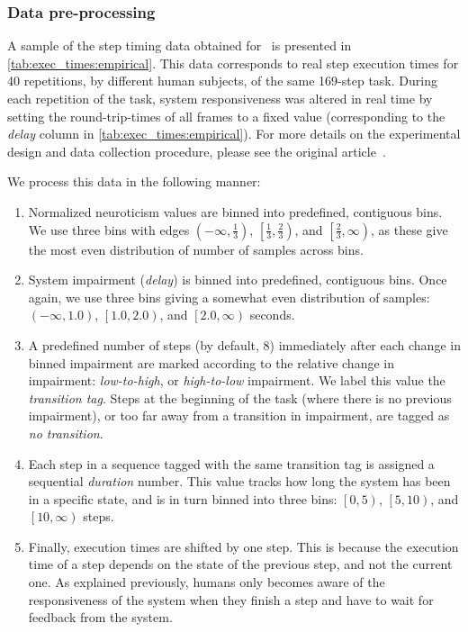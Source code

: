 \subsubsection{Data pre-processing}

A sample of the step timing data obtained for~\cite{olguinmunoz:impact2021} is presented in \cref{tab:exec_times:empirical}.
This data corresponds to real step execution times for \num{40} repetitions, by different human subjects, of the same \num{169}-step task.
During each repetition of the task, system responsiveness was altered in real time by setting the round-trip-times of all frames to a fixed value (corresponding to the \emph{delay} column in \cref{tab:exec_times:empirical}).
For more details on the experimental design and data collection procedure, please see the original article~\cite{olguinmunoz:impact2021}.

We process this data in the following manner:



\begin{enumerate}
    \item Normalized neuroticism values are binned into predefined, contiguous bins.
    We use three bins with edges
    \( \left(-\infty, \frac{1}{3}\right) \),
    \( \left[\frac{1}{3}, \frac{2}{3}\right) \),
    and \( \left[\frac{2}{3}, \infty\right) \),
    as these give the most even distribution of number of samples across bins.

    \item System impairment (\emph{delay}) is binned into predefined, contiguous bins.
    Once again, we use three bins giving a somewhat even distribution of samples:
    \( \left(-\infty, 1.0\right) \),
    \( \left[1.0, 2.0\right) \),
    and \( \left[2.0, \infty\right) \) seconds.

    \item A predefined number of steps (by default, \num{8}) immediately after each change in binned impairment are marked according to the relative change in impairment: \emph{low-to-high}, or \emph{high-to-low} impairment.
    We label this value the \emph{transition tag}.
    Steps at the beginning of the task (where there is no previous impairment), or too far away from a transition in impairment, are tagged as \emph{no transition}.

    \item Each step in a sequence tagged with the same transition tag is assigned a sequential \emph{duration} number.
    This value tracks how long the system has been in a specific state, and is in turn binned into three bins:
    \( \left[0, 5\right) \),
    \( \left[5, 10\right) \),
    and \( \left[10, \infty\right) \) steps.

    \item Finally, execution times are shifted by one step.
    This is because the execution time of a step depends on the state of the previous step, and not the current one.
    As explained previously, humans only becomes aware of the responsiveness of the system when they finish a step and have to wait for feedback from the system.
\end{enumerate}



